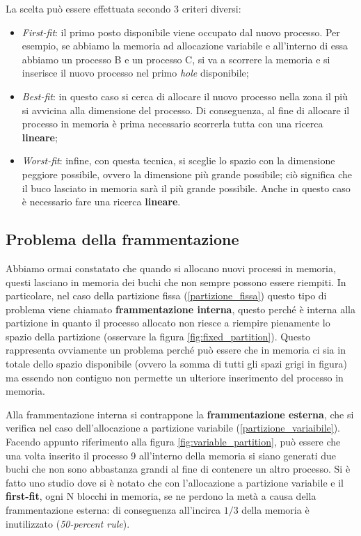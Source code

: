 \noindent La scelta può essere effettuata secondo 3 criteri diversi:
\vspace{-5px}
\begin{itemize}
\setlength{\itemsep}{-.15 em}
    \item \textit{First-fit}: il primo posto disponibile viene occupato dal nuovo processo. Per esempio, se abbiamo la memoria ad allocazione variabile e all'interno di essa abbiamo un processo B e un processo C, si va a scorrere la memoria e si inserisce il nuovo processo nel primo \textit{hole} disponibile;
    \item \textit{Best-fit}: in questo caso si cerca di allocare il nuovo processo nella zona il più si avvicina alla dimensione del processo. Di conseguenza, al fine di allocare il processo in memoria è prima necessario scorrerla tutta con una ricerca \textbf{lineare};
    \item \textit{Worst-fit}: infine, con questa tecnica, si sceglie lo spazio con la dimensione peggiore possibile, ovvero la dimensione più grande possibile; ciò significa che il buco lasciato in memoria sarà il più grande possibile. Anche in questo caso è necessario fare una ricerca \textbf{lineare}.
\end{itemize}

% 
\subsection{Problema della frammentazione}\label{frammentazione}
Abbiamo ormai constatato che quando si allocano nuovi processi in memoria, questi lasciano in memoria dei buchi che non sempre possono essere riempiti. In particolare, nel caso della partizione fissa (\ref{partizione_fissa}) questo tipo di problema viene chiamato \textbf{frammentazione interna}, questo perché è interna alla partizione in quanto il processo allocato non riesce a riempire pienamente lo spazio della partizione (osservare la figura \ref{fig:fixed_partition}). Questo rappresenta ovviamente un problema perché può essere che in memoria ci sia in totale dello spazio disponibile (ovvero la somma di tutti gli spazi grigi in figura) ma essendo non contiguo non permette un ulteriore inserimento del processo in memoria. 

Alla frammentazione interna si contrappone la \textbf{frammentazione esterna}, che si verifica nel caso dell'allocazione a partizione variabile (\ref{partizione_variaibile}). Facendo appunto riferimento alla figura \ref{fig:variable_partition}, può essere che una volta inserito il processo 9 all'interno della memoria si siano generati due buchi che non sono abbastanza grandi al fine di contenere un altro processo. Si è fatto uno studio dove si è notato che con l'allocazione a partizione variabile e il \textbf{first-fit}, ogni N blocchi in memoria, se ne perdono la metà a causa della frammentazione esterna: di conseguenza all'incirca $1/3$ della memoria è inutilizzato (\textit{50-percent rule}). 

